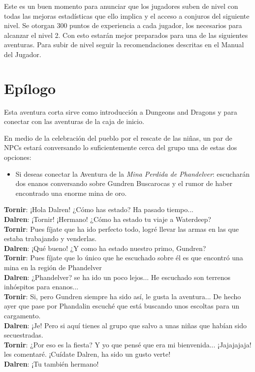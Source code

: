 \documentclass[10pt,twoside,twocolumn,openany]{dndbook}
\begin{document}
Este es un buen momento para anunciar que los jugadores suben de nivel con todas las mejoras 
estadísticas que ello implica y el acceso a conjuros del siguiente nivel. Se otorgan 300 puntos 
de experiencia a cada jugador, los necesarios para alcanzar el nivel 2. Con esto estarán mejor 
preparados para una de las siguientes aventuras. Para subir de nivel seguir la recomendaciones
descritas en el Manual del Jugador.

\section{Epílogo}

Esta aventura corta sirve como introducción a Dungeons and Dragons y para conectar con las 
aventuras de la caja de inicio.

En medio de la celebración del pueblo por el rescate de las niñas, un par de NPCs estará conversando
lo suficientemente cerca del grupo una de estas dos opciones:

\begin{itemize}
  \item Si deseas conectar la Aventura de la \emph{Mina Perdida de Phandelver}: escucharán dos 
  enanos conversando sobre Gundren Buscarocas y el rumor de haber encontrado una enorme mina de 
  oro.
\end{itemize}

\begin{DndReadAloud}
  \textbf{Tornir}: ¡Hola Dalren! ¿Cómo has estado? Ha pasado tiempo... \\
  \textbf{Dalren}: ¡Tornir! ¡Hermano! ¿Cómo ha estado tu viaje a Waterdeep? \\
  \textbf{Tornir}: Pues fíjate que ha ido perfecto todo, logré llevar las armas en las que estaba 
  trabajando y venderlas. \\
  \textbf{Dalren}: ¡Qué bueno! ¿Y como ha estado nuestro primo, Gundren? \\
  \textbf{Tornir}: Pues fíjate que lo único que he escuchado sobre él es que encontró una mina 
  en la región de Phandelver \\
  \textbf{Dalren}: ¿Phandelver? se ha ido un poco lejos... He escuchado son terrenos inhóspitos
  para enanos... \\
  \textbf{Tornir}: Si, pero Gundren siempre ha sido así, le gusta la aventura... De hecho ayer 
  que pase por Phandalin escuché que está buscando unos escoltas para un cargamento. \\
  \textbf{Dalren}: ¡Je! Pero si aquí tienes al grupo que salvo a unas niñas que habían sido 
  secuestradas. \\
  \textbf{Tornir}: ¿Por eso es la fiesta? Y yo que pensé que era mi bienvenida... ¡Jajajajaja! les 
  comentaré. ¡Cuídate Dalren, ha sido un gusto verte! \\
  \textbf{Dalren}: ¡Tu también hermano! \\
\end{DndReadAloud}
\end{document}
